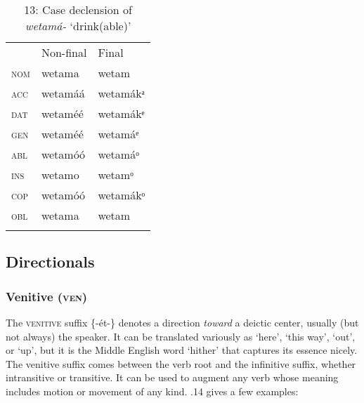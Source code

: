 \begin{table}
\caption{13: Case declension of \textit{wetamá-} ‘drink(able)’}
\label{tab:8}


\begin{tabularx}{\textwidth}{XXX} & Non-final & Final\\
\lsptoprule
\textsc{nom} & wetama & wetam\\
\textsc{acc} & wetamáá & wetamákᵃ\\
\textsc{dat} & wetaméé & wetamákᵉ\\
\textsc{gen} & wetaméé & wetamáᵉ\\
\textsc{abl} & wetamóó & wetamáᵒ\\
\textsc{ins} & wetamo & wetamᵒ\\
\textsc{cop} & wetamóó & wetamákᵒ\\
\textsc{obl} & wetama & wetam\\
\lspbottomrule
\end{tabularx}
\end{table}



\subsection{Directionals}
\subsubsection{Venitive (\textsc{ven})}

The \textsc{venitive} suffix \{-ét-\} denotes a direction \textit{toward} a deictic center, usually (but not always) the speaker. It can be translated variously as ‘here’, ‘this way’, ‘out’, or ‘up’, but it is the Middle English word ‘hither’ that captures its essence nicely. The venitive suffix comes between the verb root and the infinitive suffix, whether intransitive or transitive. It can be used to augment any verb whose meaning includes motion or movement of any kind. .14 gives a few examples:


